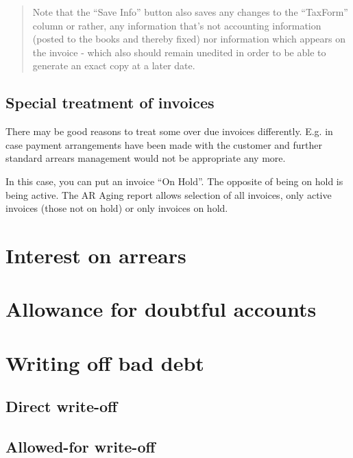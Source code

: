 \begin{quotation}
Note that the ``Save Info'' button also saves any changes to the ``TaxForm'' column or
rather, any information that's not accounting information (posted to the books and
thereby fixed) nor information which appears on the invoice - which also should remain
unedited in order to be able to generate an exact copy at a later date.
\end{quotation}


\subsection{Special treatment of invoices}
\label{subsec-workflows-credit-risk-arrears-special-treatment}

There may be good reasons to treat some over due invoices differently. E.g. in case
payment arrangements have been made with the customer and further standard arrears
management would not be appropriate any more.

In this case, you can put an invoice ``On Hold''. The opposite of being on hold is
being active. The AR Aging report allows selection of all invoices, only active
invoices (those not on hold) or only invoices on hold.


\section{Interest on arrears}
\label{sec-workflows-credit-risk-interest-on-arrears}

\section{Allowance for doubtful accounts}
\label{sec-workflows-credit-risk-allowance-doubtful-accounts}


\section{Writing off bad debt}
\label{sec-workflows-credit-risk-bad-debt-write-off}

\subsection{Direct write-off}
\label{sec-workflows-credit-risk-bad-debt-direct-write-off}

\subsection{Allowed-for write-off}
\label{sec-workflows-credit-risk-bad-debt-allowed-write-off}

